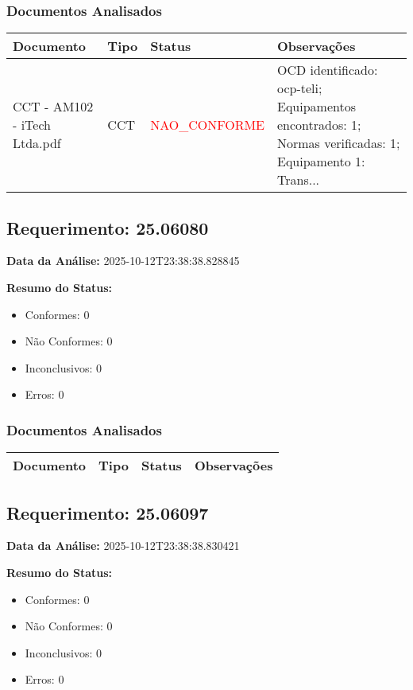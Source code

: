 \documentclass[12pt,a4paper]{article}
\begin{document}
\subsubsection{Documentos Analisados}

\begin{longtable}{|p{4cm}|p{2cm}|p{2cm}|p{6cm}|}
\hline
\textbf{Documento} & \textbf{Tipo} & \textbf{Status} & \textbf{Observações} \\
\hline
\endhead
CCT - AM102 - iTech Ltda.pdf & CCT & \textcolor{red}{NAO\_CONFORME} & OCD identificado: ocp-teli; Equipamentos encontrados: 1; Normas verificadas: 1; Equipamento 1: Trans... \\
\hline
\end{longtable}


\subsection{Requerimento: 25.06080}

\textbf{Data da Análise:} 2025-10-12T23:38:38.828845

\textbf{Resumo do Status:}
\begin{itemize}
    \item Conformes: 0
    \item Não Conformes: 0
    \item Inconclusivos: 0
    \item Erros: 0
\end{itemize}

\subsubsection{Documentos Analisados}

\begin{longtable}{|p{4cm}|p{2cm}|p{2cm}|p{6cm}|}
\hline
\textbf{Documento} & \textbf{Tipo} & \textbf{Status} & \textbf{Observações} \\
\hline
\endhead
\end{longtable}


\subsection{Requerimento: 25.06097}

\textbf{Data da Análise:} 2025-10-12T23:38:38.830421

\textbf{Resumo do Status:}
\begin{itemize}
    \item Conformes: 0
    \item Não Conformes: 0
    \item Inconclusivos: 0
    \item Erros: 0
\end{itemize}
\end{document}
